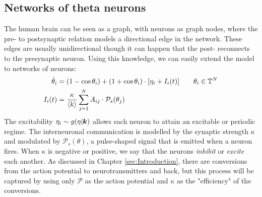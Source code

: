 


\subsection{Networks of theta neurons}
The human brain can be seen as a graph, with neurons as graph nodes, where the pre- to postsynaptic relation models a directional edge in the network. These edges are usually unidirectional though it can happen that the post- reconnects to the presynaptic neuron. Using this knowledge, we can easily extend the model to networks of neurons:
\begin{align}
\dot{\theta}_{i} &=\left(1-\cos \theta_{i}\right)+\left(1+\cos \theta_{i}\right) \cdot \left[\eta_{i} + I_{i}(t)\right] \qquad \theta_i \in \T^N  \label{eq:thetaneuronnetwork} \\
I_{i}(t) &=\frac{\kappa}{\kmean} \sum_{j=1}^{N} A_{i j} \cdot \mathcal{P}_{s}(\theta_{j}) \label{eq:thetaneuronnetworkcurrent}
\end{align}
The excitability $\eta_i \sim g(\eta \rvert {\boldsymbol{k}})$ allows each neuron to attain an excitable or periodic regime. The interneuronal communication is modelled by the synaptic strength $\kappa$ and modulated by $\mathcal{P}_s(\theta)$, a pulse-shaped signal that is emitted when a neuron fires. When $\kappa$ is negative or positive, we say that the neurons \textsl{inhibit} or \textsl{excite} each another. As discussed in Chapter \ref{sec:Introduction}, there are conversions from the action potential to neurotransmitters and back, but this process will be captured by using only $\mathcal{P}$ as the action potential and $\kappa$ as the "efficiency" of the conversions. 

